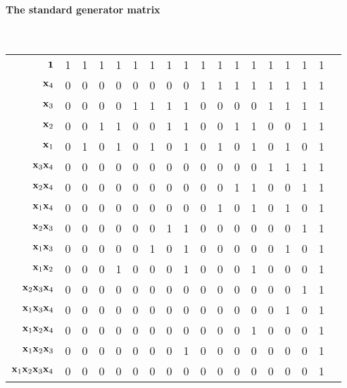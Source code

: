\documentclass[a4paper, 11pt, openany]{book}
\numberwithin{equation}{section}
\theoremstyle{plain}
\theoremstyle{definition}
\begin{document}
\paragraph{The standard generator matrix}
~\\
\begin{tabular}{rccccccccccccccccc}
	${\bf 1}$  										& 1 & 1 & 1 & 1 & 1 & 1 & 1 & 1 & 1 & 1 & 1 & 1 & 1 & 1 & 1 & 1 \\
	\cline{2-17}
	${\bf x}_4$  									& 0 & 0 & 0 & 0 & 0 & 0 & 0 & 0 & 1 & 1 & 1 & 1 & 1 & 1 & 1 & 1 \\
	${\bf x}_3$  									& 0 & 0 & 0 & 0 & 1 & 1 & 1 & 1 & 0 & 0 & 0 & 0 & 1 & 1 & 1 & 1 \\
	${\bf x}_2$  									& 0 & 0 & 1 & 1 & 0 & 0 & 1 & 1 & 0 & 0 & 1 & 1 & 0 & 0 & 1 & 1 \\
	${\bf x}_1$  									& 0 & 1 & 0 & 1 & 0 & 1 & 0 & 1 & 0 & 1 & 0 & 1 & 0 & 1 & 0 & 1 \\
	\cline{2-17}
	${\bf x}_3 {\bf x}_4$  							& 0 & 0 & 0 & 0 & 0 & 0 & 0 & 0 & 0 & 0 & 0 & 0 & 1 & 1 & 1 & 1 \\
	${\bf x}_2 {\bf x}_4$  							& 0 & 0 & 0 & 0 & 0 & 0 & 0 & 0 & 0 & 0 & 1 & 1 & 0 & 0 & 1 & 1 \\
	${\bf x}_1 {\bf x}_4$  							& 0 & 0 & 0 & 0 & 0 & 0 & 0 & 0 & 0 & 1 & 0 & 1 & 0 & 1 & 0 & 1 \\
	${\bf x}_2 {\bf x}_3$  							& 0 & 0 & 0 & 0 & 0 & 0 & 1 & 1 & 0 & 0 & 0 & 0 & 0 & 0 & 1 & 1 \\
	${\bf x}_1 {\bf x}_3$  							& 0 & 0 & 0 & 0 & 0 & 1 & 0 & 1 & 0 & 0 & 0 & 0 & 0 & 1 & 0 & 1 \\
	${\bf x}_1 {\bf x}_2$  							& 0 & 0 & 0 & 1 & 0 & 0 & 0 & 1 & 0 & 0 & 0 & 1 & 0 & 0 & 0 & 1 \\
	\cline{2-17}
	${\bf x}_2 {\bf x}_3 {\bf x}_4$  				& 0 & 0 & 0 & 0 & 0 & 0 & 0 & 0 & 0 & 0 & 0 & 0 & 0 & 0 & 1 & 1 \\
	${\bf x}_1 {\bf x}_3 {\bf x}_4$  				& 0 & 0 & 0 & 0 & 0 & 0 & 0 & 0 & 0 & 0 & 0 & 0 & 0 & 1 & 0 & 1 \\
	${\bf x}_1 {\bf x}_2 {\bf x}_4$  				& 0 & 0 & 0 & 0 & 0 & 0 & 0 & 0 & 0 & 0 & 0 & 1 & 0 & 0 & 0 & 1 \\
	${\bf x}_1 {\bf x}_2 {\bf x}_3$  				& 0 & 0 & 0 & 0 & 0 & 0 & 0 & 1 & 0 & 0 & 0 & 0 & 0 & 0 & 0 & 1 \\
	\cline{2-17}
	${\bf x}_1 {\bf x}_2 {\bf x}_3 {\bf x}_4$  		& 0 & 0 & 0 & 0 & 0 & 0 & 0 & 0 & 0 & 0 & 0 & 0 & 0 & 0 & 0 & 1 
\end{tabular}
~\\
\end{document}
